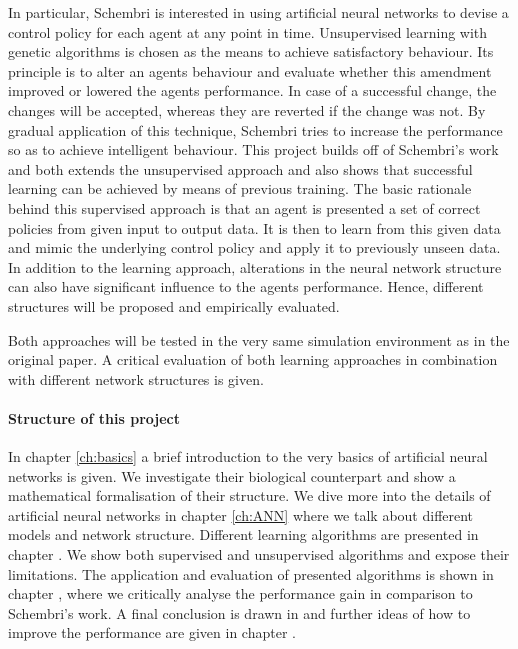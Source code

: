 \documentclass[10pt,a4paper,DIV=11]{scrreprt}
\begin{document}
In particular, Schembri is interested in using artificial neural networks to devise a control policy for each agent at any point in time. 
Unsupervised learning with genetic algorithms is chosen as the means to achieve satisfactory behaviour. Its principle is to alter 
an agents behaviour and evaluate whether this amendment improved or lowered the agents performance. In case of a successful change, the changes
will be accepted, whereas they are reverted if the change was not. By gradual application of this technique, Schembri tries to increase
the performance so as to achieve intelligent behaviour.
This project builds off of Schembri's work and both extends the unsupervised approach and also shows that successful learning can be 
achieved by means of previous training. The basic rationale behind this supervised approach is that an agent is presented a set of correct 
policies from given input to output data. It is then to learn from this given data and mimic the underlying control policy and apply it to
previously unseen data. In addition to the learning approach, alterations in the neural network structure can also have significant influence
to the agents performance. Hence, different structures will be proposed and empirically evaluated.

Both approaches will be tested in the very same simulation environment as in the original paper. A critical evaluation of both learning approaches
in combination with different network structures is given.

\paragraph{Structure of this project}
In chapter \ref{ch:basics} a brief introduction to the very basics of artificial neural networks is given. We investigate their biological counterpart
and show a mathematical formalisation of their structure. We dive more into the details of artificial neural networks in chapter \ref{ch:ANN} where
we talk about different models and network structure. Different learning algorithms are presented in chapter \label{ch:learning}. We show both
supervised and unsupervised algorithms and expose their limitations. The application and evaluation of presented algorithms is shown in
chapter \label{ch:eval}, where we critically analyse the performance gain in comparison to Schembri's work. A final conclusion is drawn in 
\label{ch:conclusion} and further ideas of how to improve the performance are given in chapter \label{ch:future}.
\end{document}
